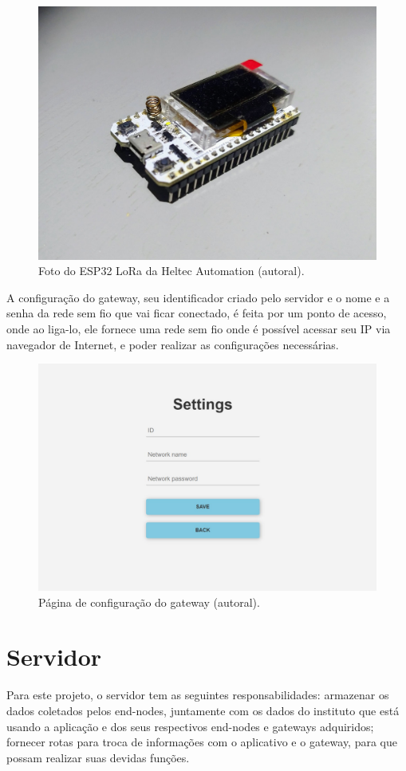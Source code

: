 \begin{figure}[H]
  \centering
  \includegraphics[width=.80\textwidth]{assets/esp32-lora.png} 
  \caption{Foto do ESP32 LoRa da Heltec Automation (autoral).}
  \label{fig:esp32-lora} 
\end{figure}

A configuração do gateway, seu identificador criado pelo servidor e o nome e a senha da rede sem fio que vai ficar conectado, é feita por um ponto de acesso, onde ao liga-lo, ele fornece uma rede sem fio onde é possível acessar seu IP via navegador de Internet, e poder realizar as configurações necessárias.

\begin{figure}[H]
  \centering
  \includegraphics[width=.80\textwidth]{assets/gateway-ap.png} 
  \caption{Página de configuração do gateway (autoral).}
  \label{fig:gateway-ap} 
\end{figure}

\section{Servidor}
\label{metod:servidor}
Para este projeto, o servidor tem as seguintes responsabilidades: armazenar os dados coletados pelos end-nodes, juntamente com os dados do instituto que está usando a aplicação e dos seus respectivos end-nodes e gateways adquiridos; fornecer rotas para troca de informações com o aplicativo e o gateway, para que possam realizar suas devidas funções.


